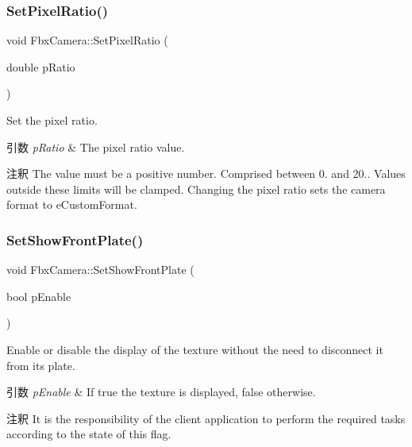 \subsubsection{\texorpdfstring{Set\+Pixel\+Ratio()}{SetPixelRatio()}}
{\footnotesize\ttfamily void Fbx\+Camera\+::\+Set\+Pixel\+Ratio (\begin{DoxyParamCaption}\item[{double}]{p\+Ratio }\end{DoxyParamCaption})}

Set the pixel ratio. 
\begin{DoxyParams}{引数}
{\em p\+Ratio} & The pixel ratio value. \\
\hline
\end{DoxyParams}
\begin{DoxyRemark}{注釈}
The value must be a positive number. Comprised between 0. and 20.. Values outside these limits will be clamped. Changing the pixel ratio sets the camera format to e\+Custom\+Format. 
\end{DoxyRemark}
\mbox{\label{class_fbx_camera_a68f728e9e8fea2ab93f2b050841b4d75}} 
\subsubsection{\texorpdfstring{Set\+Show\+Front\+Plate()}{SetShowFrontPlate()}}
{\footnotesize\ttfamily void Fbx\+Camera\+::\+Set\+Show\+Front\+Plate (\begin{DoxyParamCaption}\item[{bool}]{p\+Enable }\end{DoxyParamCaption})}

Enable or disable the display of the texture without the need to disconnect it from its plate. 
\begin{DoxyParams}{引数}
{\em p\+Enable} & If {\ttfamily true} the texture is displayed, {\ttfamily false} otherwise. \\
\hline
\end{DoxyParams}
\begin{DoxyRemark}{注釈}
It is the responsibility of the client application to perform the required tasks according to the state of this flag. 
\end{DoxyRemark}
\mbox{\label{class_fbx_camera_a4ef18832cc863f5dcc086d0d10686122}} 
